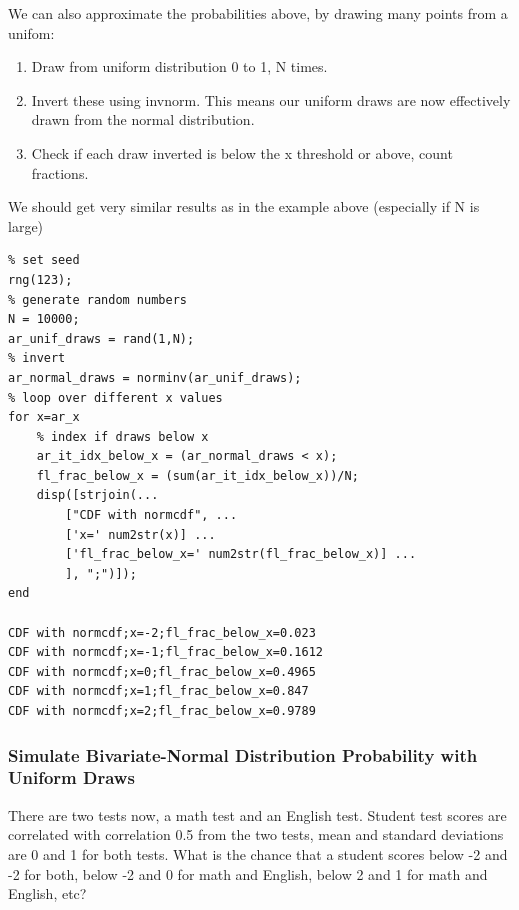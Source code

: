 \documentclass[
]{book}
\begin{document}
We can also approximate the probabilities above, by drawing many points
from a unifom:

\begin{enumerate}
\def\labelenumi{\arabic{enumi}.}
\item
  Draw from uniform distribution 0 to 1, N times.
\item
  Invert these using invnorm. This means our uniform draws are now
  effectively drawn from the normal distribution.
\item
  Check if each draw inverted is below the x threshold or above, count
  fractions.
\end{enumerate}

We should get very similar results as in the example above (especially
if N is large)

\begin{verbatim}
% set seed
rng(123);
% generate random numbers
N = 10000;
ar_unif_draws = rand(1,N);
% invert
ar_normal_draws = norminv(ar_unif_draws);
% loop over different x values
for x=ar_x
    % index if draws below x
    ar_it_idx_below_x = (ar_normal_draws < x);
    fl_frac_below_x = (sum(ar_it_idx_below_x))/N;
    disp([strjoin(...
        ["CDF with normcdf", ...
        ['x=' num2str(x)] ...
        ['fl_frac_below_x=' num2str(fl_frac_below_x)] ...
        ], ";")]);
end

CDF with normcdf;x=-2;fl_frac_below_x=0.023
CDF with normcdf;x=-1;fl_frac_below_x=0.1612
CDF with normcdf;x=0;fl_frac_below_x=0.4965
CDF with normcdf;x=1;fl_frac_below_x=0.847
CDF with normcdf;x=2;fl_frac_below_x=0.9789
\end{verbatim}

\hypertarget{simulate-bivariate-normal-distribution-probability-with-uniform-draws}{%
\subsubsection{Simulate Bivariate-Normal Distribution Probability with Uniform Draws}\label{simulate-bivariate-normal-distribution-probability-with-uniform-draws}}

There are two tests now, a math test and an English test. Student test
scores are correlated with correlation 0.5 from the two tests, mean and
standard deviations are 0 and 1 for both tests. What is the chance that
a student scores below -2 and -2 for both, below -2 and 0 for math and
English, below 2 and 1 for math and English, etc?
\end{document}
